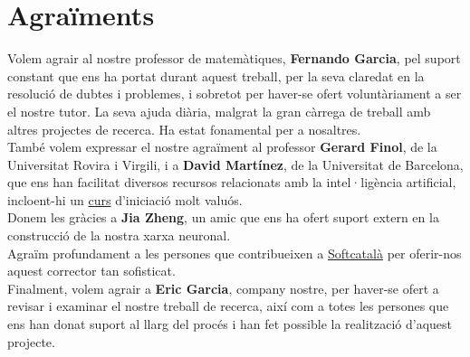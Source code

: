 \chapter*{Agraïments}
Volem agrair al nostre professor de matemàtiques, \textbf{Fernando Garcia}, pel suport constant que ens ha portat durant aquest treball, per la seva claredat en la resolució de dubtes i problemes, i sobretot per haver-se ofert voluntàriament a ser el nostre tutor. La seva ajuda diària, malgrat la gran càrrega de treball amb altres projectes de recerca. Ha estat fonamental per a nosaltres.\\[0.2cm]
També volem expressar el nostre agraïment al professor \textbf{Gerard Finol}, de la Universitat Rovira i Virgili, i a \textbf{David Martínez}, de la Universitat de Barcelona, que ens han facilitat diversos recursos relacionats amb la intel·ligència artificial, incloent-hi un \href{https://www.coursera.org/specializations/deep-learning#courses}{curs} d’iniciació molt valuós.\\[0.2cm]
Donem les gràcies a \textbf{Jia Zheng}, un amic que ens ha ofert suport extern en la construcció de la nostra xarxa neuronal.\\[0.2cm]
Agraïm profundament a les persones que contribueixen a \href{https://www.softcatala.org/corrector/}{Softcatalà} per oferir-nos aquest corrector tan sofisticat.\\[0.2cm]
Finalment, volem agrair a \textbf{Eric Garcia}, company nostre, per haver-se ofert a revisar i examinar el nostre treball de recerca, així com a totes les persones que ens han donat suport al llarg del procés i han fet possible la realització d’aquest projecte.

